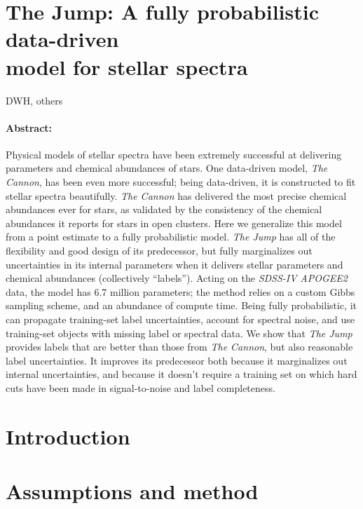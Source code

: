 \documentclass[12pt, letterpaper]{article}
\newcommand{\project}[1]{\textsl{{#1}}}
\newcommand{\acronym}[1]{{\small{#1}}}
\begin{document}
\section*{The Jump: A fully probabilistic data-driven \\
model for stellar spectra}

\noindent
DWH, others

\paragraph{Abstract:}
Physical models of stellar spectra have been extremely successful
at delivering parameters and chemical abundances of stars.
One data-driven model, \project{The Cannon}, has been even more
successful; being data-driven, it is constructed to fit stellar
spectra beautifully.
\project{The Cannon} has delivered the most precise chemical abundances ever for
stars, as validated by the consistency of the chemical abundances
it reports for stars in open clusters.
Here we generalize this model from a point estimate to a fully
probabilistic model.
\project{The Jump} has all of the flexibility and good design of
its predecessor, but fully marginalizes out uncertainties in its
internal parameters when it delivers stellar parameters and
chemical abundances (collectively ``labels'').
Acting on the \project{\acronym{SDSS-IV}} \project{\acronym{APOGEE2}} data, the model
has 6.7 million parameters; the method relies on a custom Gibbs sampling
scheme, and an abundance of compute time.
Being fully probabilistic, it can propagate training-set label uncertainties,
account for spectral noise, and use training-set objects with missing label or spectral data.
We show that \project{The Jump} provides labels that are better than those
from \project{The Cannon}, but also reasonable label uncertainties.
It improves its predecessor both because it marginalizes out internal
uncertainties, and because it doesn't require a training set on which
hard cuts have been made in signal-to-noise and label completeness.

\section{Introduction}

\section{Assumptions and method}
\end{document}
